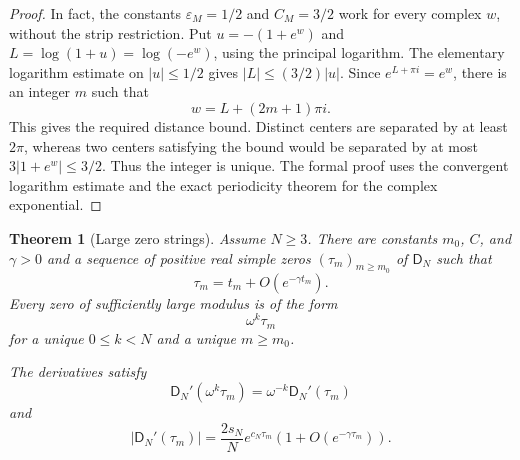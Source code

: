 \documentclass[11pt,letterpaper]{article}
\newtheorem{theorem}{Theorem}[section]
\theoremstyle{definition}
\theoremstyle{remark}
\newcommand{\Dfun}{\mathsf D}
\begin{document}
\begin{proof}
In fact, the constants $\varepsilon_M=1/2$ and $C_M=3/2$ work
for every complex $w$, without the strip restriction. Put
$u=-(1+e^w)$ and $L=\log(1+u)=\log(-e^w)$, using the principal
logarithm. The elementary logarithm estimate on $|u|\leq1/2$ gives
$|L|\leq(3/2)|u|$. Since $e^{L+\pi i}=e^w$, there is an integer
$m$ such that
\[
w=L+(2m+1)\pi i.
\]
This gives the required distance bound. Distinct centers are separated
by at least $2\pi$, whereas two centers satisfying the bound would
be separated by at most $3|1+e^w|\leq3/2$. Thus the integer is unique.
The formal proof uses the convergent logarithm estimate and the exact
periodicity theorem for the complex exponential.
\end{proof}

\begin{theorem}[Large zero strings]\label{thm:large_zero_strings}
Assume $N\geq3$.  There are constants $m_0$, $C$, and $\gamma>0$ and a sequence of positive real simple zeros $(\tau_m)_{m\geq m_0}$ of $\Dfun_N$ such that
\[
\tau_m
=
 t_m+O(e^{-\gamma t_m}).
\]
Every zero of sufficiently large modulus is of the form
\[
\omega^k\tau_m
\]
for a unique $0\leq k<N$ and a unique $m\geq m_0$.

The derivatives satisfy
\[
\Dfun_N'(\omega^k\tau_m)
=
\omega^{-k}\Dfun_N'(\tau_m)
\]
and
\[
|\Dfun_N'(\tau_m)|
=
\frac{2s_N}{N}e^{c_N\tau_m}
\left(1+O(e^{-\gamma\tau_m})\right).
\]
\end{theorem}
\end{document}
